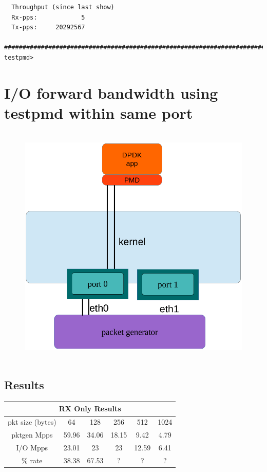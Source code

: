 \documentclass[letter]{article}
\begin{document}
{{\begin{lstlisting}
  Throughput (since last show)
  Rx-pps:            5
  Tx-pps:     20292567
  ############################################################################
testpmd> 

\end{lstlisting}


\section{I/O forward bandwidth using testpmd within same port}
{\setlength{\parindent}{0cm}

\begin{figure}[H]
\hbox{\hspace{-0.5cm} \includegraphics[scale=0.6]{i-o-1-port} }
\end{figure}

\subsection{Results}
\large
\begin{center}
\begin{tabular}{ |c|c|c|c|c|c| }
\hline
\multicolumn{6}{|c|}{RX Only Results} \\
 \hline
 pkt size (bytes) & 64 & 128 & 256 & 512 & 1024\\ 
\hline
 pktgen Mpps & 59.96 & 34.06 & 18.15 & 9.42 & 4.79\\ 
 I/O Mpps & 23.01 & 23 & 23 & 12.59 & 6.41\\ 
\hline
\rowcolor{yellow}
\% rate & 38.38 & 67.53 & ? & ? & ?\\
 \hline
\end{tabular}
\end{center}

}}}
\end{document}
